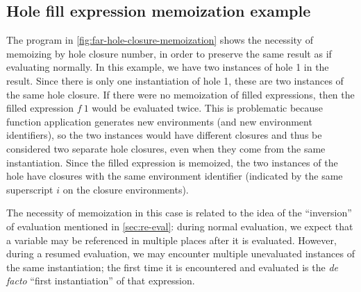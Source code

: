 \subsection{Hole fill expression memoization example}
\label{sec:far-hole-fill-memoization-example}

The program in \cref{fig:far-hole-closure-memoization} shows the necessity of memoizing by hole closure number, in order to preserve the same result as if evaluating normally. In this example, we have two instances of hole 1 in the result. Since there is only one instantiation of hole 1, these are two instances of the same hole closure. If there were no memoization of filled expressions, then the filled expression $f\ 1$ would be evaluated twice. This is problematic because function application generates new environments (and new environment identifiers), so the two instances would have different closures and thus be considered two separate hole closures, even when they come from the same instantiation. Since the filled expression is memoized, the two instances of the hole have closures with the same environment identifier (indicated by the same superscript $i$ on the closure environments).

The necessity of memoization in this case is related to the idea of the ``inversion'' of evaluation mentioned in \cref{sec:re-eval}: during normal evaluation, we expect that a variable may be referenced in multiple places after it is evaluated. However, during a resumed evaluation, we may encounter multiple unevaluated instances of the same instantiation; the first time it is encountered and evaluated is the \textit{de facto} ``first instantiation'' of that expression.

